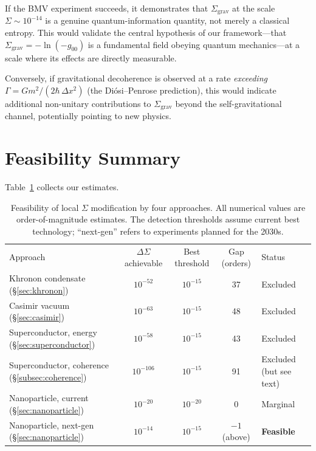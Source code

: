 \documentclass[prd,twocolumn,superscriptaddress,longbibliography,floatfix]{revtex4-2}
\newcommand{\Sgrav}{\Sigma_{\mathrm{grav}}}
\newcommand{\DSigma}{\Delta\Sigma}
\begin{document}
If the BMV experiment succeeds, it demonstrates that $\Sgrav$ at the
scale $\Sigma \sim 10^{-14}$ is a genuine quantum-information
quantity, not merely a classical entropy.  This would validate the
central hypothesis of our framework---that $\Sgrav = -\ln(-g_{00})$
is a fundamental field obeying quantum mechanics---at a scale where
its effects are directly measurable.

Conversely, if gravitational decoherence is observed at a rate
\emph{exceeding} $\Gamma = G m^2/(2\hbar\,\Delta x^2)$
(the Di\'osi--Penrose prediction), this would indicate additional
non-unitary contributions to $\Sgrav$ beyond the self-gravitational
channel, potentially pointing to new physics.

\section{Feasibility Summary}
\label{sec:summary}

Table~\ref{tab:summary} collects our estimates.

\begin{table}[t]
\caption{Feasibility of local $\Sigma$ modification by four approaches.
All numerical values are order-of-magnitude estimates.  The detection
thresholds assume current best technology; ``next-gen'' refers to
experiments planned for the 2030s.
\label{tab:summary}}
\begin{ruledtabular}
\begin{tabular}{lcccl}
Approach & $\DSigma$ achievable & Best threshold & Gap (orders)
& Status \\
\colrule
Khronon condensate (\S\ref{sec:khronon})
  & $10^{-52}$ & $10^{-15}$ & 37 & Excluded \\
Casimir vacuum (\S\ref{sec:casimir})
  & $10^{-63}$ & $10^{-15}$ & 48 & Excluded \\
Superconductor, energy (\S\ref{sec:superconductor})
  & $10^{-58}$ & $10^{-15}$ & 43 & Excluded \\
Superconductor, coherence (\S\ref{subsec:coherence})
  & $10^{-106}$ & $10^{-15}$ & 91 & Excluded (but see text) \\
Nanoparticle, current (\S\ref{sec:nanoparticle})
  & $10^{-20}$ & $10^{-20}$ & 0 & Marginal \\
Nanoparticle, next-gen (\S\ref{sec:nanoparticle})
  & $10^{-14}$ & $10^{-15}$ & $-1$ (above) & \textbf{Feasible} \\
\end{tabular}
\end{ruledtabular}
\end{table}
\end{document}

